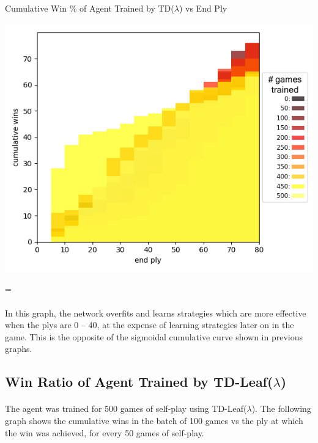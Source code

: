 \documentclass[12pt,a4paper]{book}
\newenvironment{absolutelynopagebreak}
{\par\nobreak\vfil\penalty0\vfilneg
  \vtop\bgroup}
{\par\xdef\tpd{\the\prevdepth}\egroup
  \prevdepth=\tpd}
\begin{document}
\begin{absolutelynopagebreak}
\begin{center}
  \centerline{Cumulative Win \% of Agent Trained by TD($\lambda$) vs End Ply}
  \includegraphics[scale=0.5]{lambdabad.png}
\end{center}
\end{absolutelynopagebreak}

\paragraph{} In this graph, the network overfits and learns strategies which are more effective when the plys are 0 -- 40, at the expense of learning strategies later on in the game. This is the opposite of the sigmoidal cumulative curve shown in previous graphs.

\subsection{Win Ratio of Agent Trained by TD-Leaf($\lambda$)}

\paragraph{} The agent was trained for 500 games of self-play using TD-Leaf($\lambda$). The following graph shows the cumulative wins in the batch of 100 games vs the ply at which the win was achieved, for every 50 games of self-play.
\end{document}
